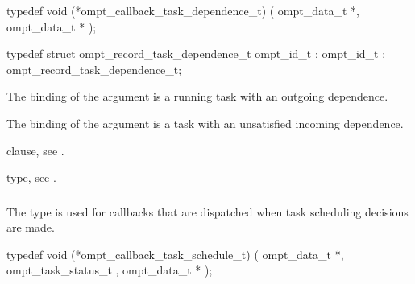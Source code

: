\format
\begin{ccppspecific}
\begin{omptCallback}
typedef void (*ompt_callback_task_dependence_t) (
  ompt_data_t *,
  ompt_data_t *
);
\end{omptCallback}
\end{ccppspecific}

\record
\begin{ccppspecific}
\begin{omptRecord}
typedef struct ompt_record_task_dependence_t {
  ompt_id_t ;
  ompt_id_t ;
} ompt_record_task_dependence_t;
\end{omptRecord}
\end{ccppspecific}

\argdesc
The binding of the  argument is a running task
with an outgoing dependence.

The binding of the  argument is a task with an
unsatisfied incoming dependence.

\begin{crossrefs}
\item {} clause, see .

\item {} type, see
.
\end{crossrefs}



\subsubsection{}
\label{sec:ompt_callback_task_schedule_t}

\summary
The  type is used for callbacks that are 
dispatched when task scheduling decisions are made.

\format
\begin{ccppspecific}
\begin{omptCallback}
typedef void (*ompt_callback_task_schedule_t) (
  ompt_data_t *,
  ompt_task_status_t ,
  ompt_data_t *
);
\end{omptCallback}
\end{ccppspecific}

